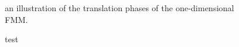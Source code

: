 \begin{figure}[h]
  \centering
  
  \caption{an illustration of the translation phases of the
    one-dimensional FMM.}\label{fig:fmm}
\end{figure}

\begin{figure}[h]
  \centering
  
  \caption{test}\label{fig:optL}
\end{figure}

